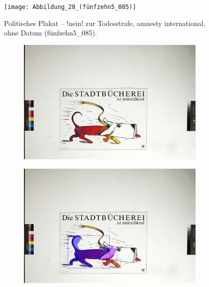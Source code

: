 \documentclass[a4paper,12pt,ngerman]{article}
\begin{document}
\newpage
\begin{figure}[ht]
\texttt{[image: Abbildung\_28\_(fünfzehn5\_085)]}
\centering
\caption{Politisches Plakat -- !nein! zur Todesstrafe, amnesty international, ohne Datum (fünfzehn5\_085).}
\end{figure}

\newpage
\begin{figure}[ht]
	\begin{subfigure}[b]{\linewidth}
	\centering
	\includegraphics[height=\linewidth, angle=90]{Abbildung_29_(acht1_015)}
	\end{subfigure}
	\begin{subfigure}[b]{\linewidth}
	\centering
	\includegraphics[height=\linewidth, angle=90]{Abbildung_29_(acht1_015)_with_detections}

\end{subfigure}
\end{figure}
\end{document}
